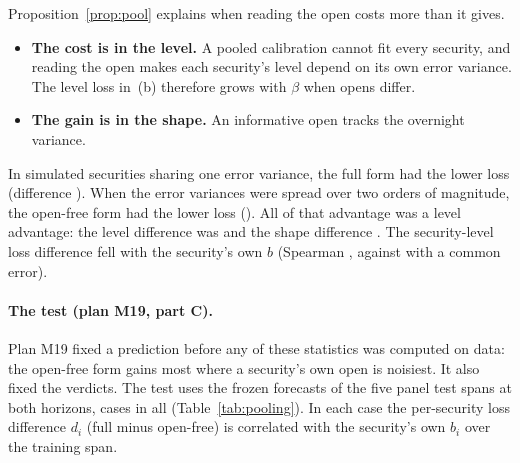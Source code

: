 Proposition~\ref{prop:pool} explains when reading the open costs more than it gives.
\begin{itemize}
  \item \textbf{The cost is in the level.} A pooled calibration cannot fit every security, and
        reading the open makes each security's level depend on its own error variance. The level
        loss in~(b) therefore grows with $\beta$ when opens differ.
  \item \textbf{The gain is in the shape.} An informative open tracks the overnight variance.
\end{itemize}
In  simulated securities sharing one error variance, the full form had the lower
loss (difference ). When the error variances were spread over two orders of
magnitude, the open-free form had the lower loss (). All of that advantage
was a level advantage: the level difference was  and the shape difference
. The security-level loss difference fell with the security's own $b$
(Spearman , against  with a common error).

\paragraph{The test (plan M19, part C).}
Plan M19 fixed a prediction before any of these statistics was computed on data: the open-free
form gains most where a security's own open is noisiest. It also fixed the verdicts. The test uses
the frozen forecasts of the five panel test spans at both horizons,  cases in all
(Table~\ref{tab:pooling}). In each case the per-security loss difference $d_i$ (full minus
open-free) is correlated with the security's own $b_i$ over the training span.

